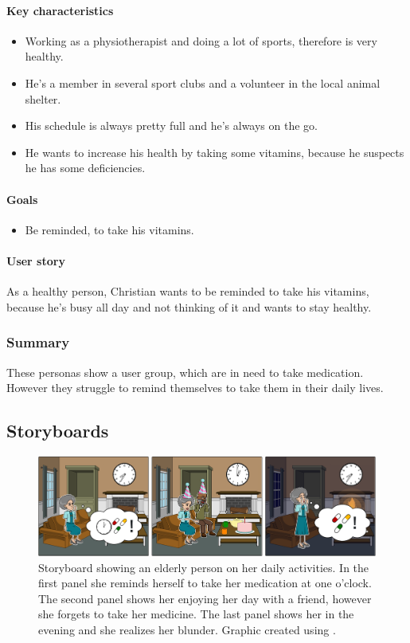 \documentclass[conference]{IEEEtran}
\begin{document}
\paragraph*{Key characteristics}
\begin{itemize}[leftmargin=1.25cm]
	\item Working as a physiotherapist and doing a lot of sports, therefore is very healthy.
	\item He's a member in several sport clubs and a volunteer in the local animal shelter.
	\item His schedule is always pretty full and he's always on the go.
	\item He wants to increase his health by taking some vitamins, because he suspects he has some deficiencies.
\end{itemize}

\paragraph*{Goals}
\begin{itemize}[leftmargin=1.25cm]
	\item Be reminded, to take his vitamins.

\end{itemize}

\paragraph*{User story}
As a healthy person, Christian wants to be reminded to take his vitamins, because he's busy all day and
not thinking of it and wants to stay healthy.

\subsubsection{Summary}
These personas show a user group, which are in need to take medication. However they struggle to 
remind themselves to take them in their daily lives.

\subsection{Storyboards}
\begin{figure}
	\includegraphics[width=\linewidth]{images/storyboard01.png}
	\caption
	{Storyboard showing an elderly person on her daily activities.
		In the first panel she reminds herself to take her medication at one o'clock.
		The second panel shows her enjoying her day with a friend, however she forgets to take her medicine.
		The last panel shows her in the evening and she realizes her blunder.
		Graphic created using \cite{storyboard}.}
	\label{fig:storyboard1}
\end{figure}
\end{document}

